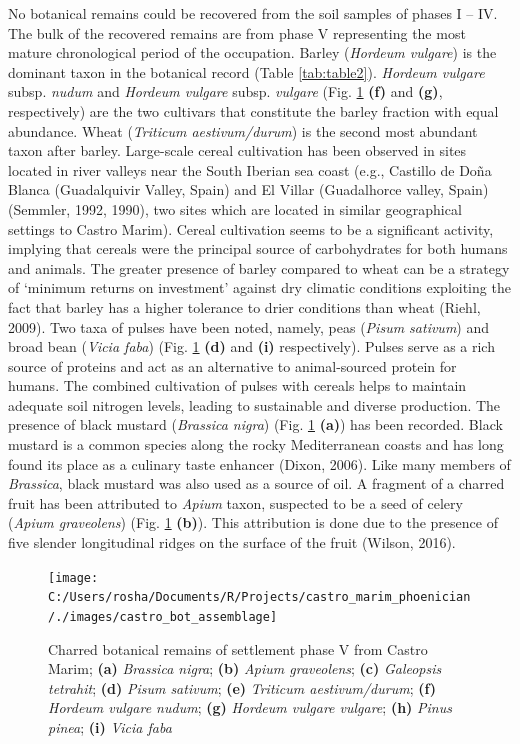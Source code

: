 \documentclass[review]{elsarticle} %
\begin{document}
No botanical remains could be recovered from the soil samples of phases I -- IV. The bulk of the recovered remains are from phase V representing the most mature chronological period of the occupation. Barley (\emph{Hordeum vulgare}) is the dominant taxon in the botanical record (Table \ref{tab:table2}). \emph{Hordeum vulgare} subsp. \emph{nudum} and \emph{Hordeum vulgare} subsp. \emph{vulgare} (Fig. \ref{fig:castro-archbot-assemblage} \textbf{(f)} and \textbf{(g)}, respectively) are the two cultivars that constitute the barley fraction with equal abundance. Wheat (\emph{Triticum aestivum/durum}) is the second most abundant taxon after barley. Large-scale cereal cultivation has been observed in sites located in river valleys near the South Iberian sea coast (e.g., Castillo de Doña Blanca (Guadalquivir Valley, Spain) and El Villar (Guadalhorce valley, Spain) (Semmler, 1992, 1990), two sites which are located in similar geographical settings to Castro Marim). Cereal cultivation seems to be a significant activity, implying that cereals were the principal source of carbohydrates for both humans and animals.
The greater presence of barley compared to wheat can be a strategy of `minimum returns on investment' against dry climatic conditions exploiting the fact that barley has a higher tolerance to drier conditions than wheat (Riehl, 2009). Two taxa of pulses have been noted, namely, peas (\emph{Pisum sativum}) and broad bean (\emph{Vicia faba}) (Fig. \ref{fig:castro-archbot-assemblage} \textbf{(d)} and \textbf{(i)} respectively). Pulses serve as a rich source of proteins and act as an alternative to animal-sourced protein for humans. The combined cultivation of pulses with cereals helps to maintain adequate soil nitrogen levels, leading to sustainable and diverse production. The presence of black mustard (\emph{Brassica nigra}) (Fig. \ref{fig:castro-archbot-assemblage} \textbf{(a)}) has been recorded. Black mustard is a common species along the rocky Mediterranean coasts and has long found its place as a culinary taste enhancer (Dixon, 2006). Like many members of \emph{Brassica}, black mustard was also used as a source of oil. A fragment of a charred fruit has been attributed to \emph{Apium} taxon, suspected to be a seed of celery (\emph{Apium graveolens}) (Fig. \ref{fig:castro-archbot-assemblage} \textbf{(b)}). This attribution is done due to the presence of five slender longitudinal ridges on the surface of the fruit (Wilson, 2016).



\begin{figure}
\texttt{[image: C:/Users/rosha/Documents/R/Projects/castro\_marim\_phoenician/./images/castro\_bot\_assemblage]} \caption{Charred botanical remains of settlement phase V from Castro Marim; \textbf{(a)} \emph{Brassica nigra}; \textbf{(b)} \emph{Apium graveolens}; \textbf{(c)} \emph{Galeopsis tetrahit}; \textbf{(d)} \emph{Pisum sativum}; \textbf{(e)} \emph{Triticum aestivum/durum}; \textbf{(f)} \emph{Hordeum vulgare nudum}; \textbf{(g)} \emph{Hordeum vulgare vulgare}; \textbf{(h)} \emph{Pinus pinea}; \textbf{(i)} \emph{Vicia faba}}\label{fig:castro-archbot-assemblage}
\end{figure}
\end{document}
